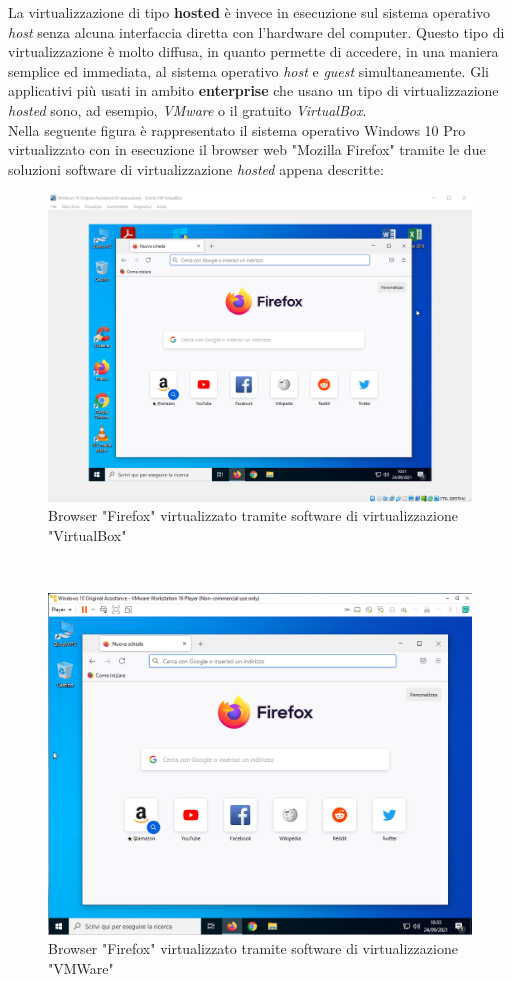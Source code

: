 La virtualizzazione di tipo \textbf{hosted} è invece in esecuzione sul sistema operativo \textit{host} senza alcuna interfaccia diretta con l'hardware del computer. Questo tipo di virtualizzazione è molto diffusa, in quanto permette di accedere, in una maniera semplice ed immediata, al sistema operativo \textit{host} e \textit{guest} simultaneamente. Gli applicativi più usati in ambito \textbf{enterprise} che usano un tipo di virtualizzazione \textit{hosted} sono, ad esempio, \textit{VMware} o il gratuito \textit{VirtualBox}.\\
Nella seguente figura è rappresentato il sistema operativo Windows 10 Pro virtualizzato con in esecuzione il browser web "Mozilla Firefox" tramite le due soluzioni software di virtualizzazione \textit{hosted} appena descritte:
\begin{figure}[!h]     
\centering 
    \includegraphics[width=0.6\columnwidth]{immagini/screenshot/firefox_virtualbox} 
    \caption{Browser "Firefox" virtualizzato tramite software di virtualizzazione "VirtualBox"}
\end{figure} \\

\begin{figure}[!h]     
\centering 
    \includegraphics[width=0.6\columnwidth]{immagini/screenshot/firefox_vmware} 
    \caption{Browser "Firefox" virtualizzato tramite software di virtualizzazione "VMWare"}
\end{figure}
\newpage

